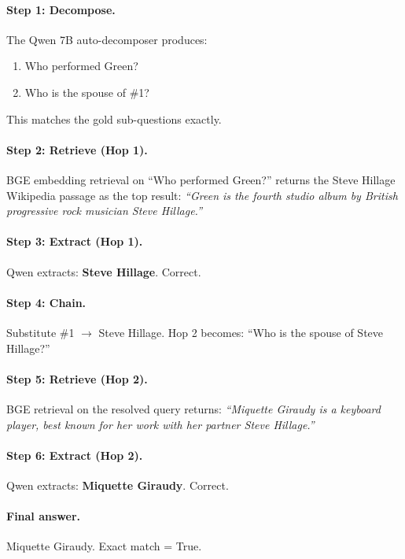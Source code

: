 \documentclass[11pt]{article}
\begin{document}
\paragraph{Step 1: Decompose.} The Qwen 7B auto-decomposer produces:
\begin{enumerate}[nosep]
    \item Who performed Green?
    \item Who is the spouse of \#1?
\end{enumerate}
This matches the gold sub-questions exactly.

\paragraph{Step 2: Retrieve (Hop 1).} BGE embedding retrieval on ``Who performed Green?'' returns the Steve Hillage Wikipedia passage as the top result: \emph{``Green is the fourth studio album by British progressive rock musician Steve Hillage.''}

\paragraph{Step 3: Extract (Hop 1).} Qwen extracts: \textbf{Steve Hillage}. Correct.

\paragraph{Step 4: Chain.} Substitute \#1 $\rightarrow$ Steve Hillage. Hop 2 becomes: ``Who is the spouse of Steve Hillage?''

\paragraph{Step 5: Retrieve (Hop 2).} BGE retrieval on the resolved query returns: \emph{``Miquette Giraudy is a keyboard player, best known for her work with her partner Steve Hillage.''}

\paragraph{Step 6: Extract (Hop 2).} Qwen extracts: \textbf{Miquette Giraudy}. Correct.

\paragraph{Final answer.} Miquette Giraudy. Exact match = True.

\medskip
\end{document}
